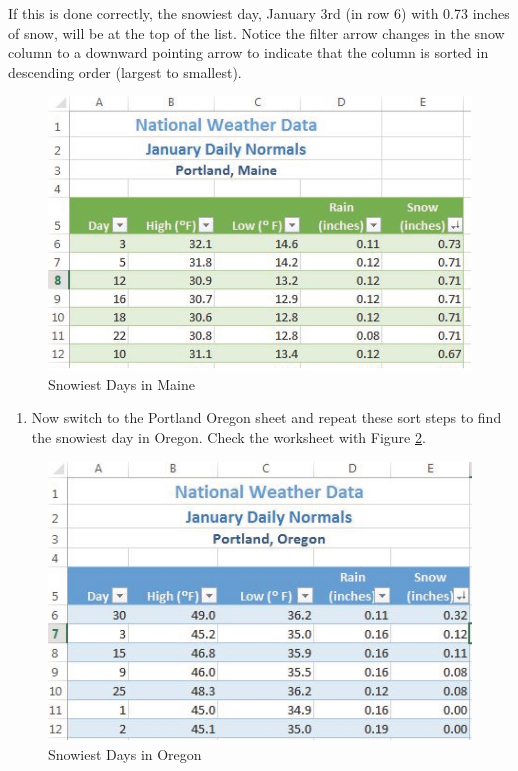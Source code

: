 If this is done correctly, the snowiest day, January 3rd (in row 6) with 0.73 inches of snow, will be at the top of the list. Notice the filter arrow changes in the snow column to a downward pointing arrow to indicate that the column is sorted in descending order (largest to smallest).

\begin{figure}[H]
	\centering
	\includegraphics[width=\maxwidth{.95\linewidth}]{gfx/ch05_fig09}
	\caption{Snowiest Days in Maine}
	\label{05:fig09}
\end{figure}

\begin{enumerate}
	\item Now switch to the Portland Oregon sheet and repeat these sort steps to find the snowiest day in Oregon. Check the worksheet with Figure \ref{05:fig10}.
\end{enumerate}

\begin{figure}[H]
	\centering
	\includegraphics[width=\maxwidth{.95\linewidth}]{gfx/ch05_fig10}
	\caption{Snowiest Days in Oregon}
	\label{05:fig10}
\end{figure}

